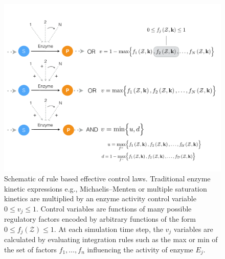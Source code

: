 \documentclass[12pt]{article}
\begin{document}
\clearpage

\begin{figure}
\centering
\includegraphics[width=1.0\textwidth]{./figs/Figure-2-ControlSchematic.pdf}
\caption{Schematic of rule based effective control laws. 
Traditional enzyme kinetic expressions e.g., Michaelis–Menten or multiple saturation kinetics are multiplied by an enzyme activity control variable $0 \leq v_{j} \leq 1 $. 
Control variables are functions of many possible regulatory factors encoded by arbitrary functions of the form $0\leq f_{j}\left(\mathcal{Z}\right)\leq 1$.
At each simulation time step, the $v_{j}$ variables are calculated by evaluating integration rules such as the max or min of the set of factors $f_{1},\hdots,f_{n}$ 
influencing the activity of enzyme $E_{j}$. }\label{fig-control-schematic}
\end{figure}

\clearpage
\end{document}
